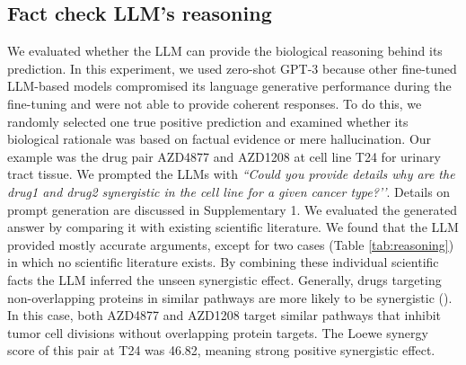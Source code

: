 \subsection{Fact check LLM's reasoning}
We evaluated whether the LLM can provide the biological reasoning behind its prediction. In this experiment, we used zero-shot GPT-3 because other fine-tuned LLM-based models compromised its language generative performance during the fine-tuning and were not able to provide coherent responses. To do this, we randomly selected one true positive prediction and examined whether its biological rationale was based on factual evidence or mere hallucination. Our example was the drug pair AZD4877 and AZD1208 at cell line T24 for urinary tract tissue. We prompted the LLMs with \emph{``Could you provide details why are the drug1 and drug2 synergistic in the cell line for a given cancer type?’’}. Details on prompt generation are discussed in Supplementary 1.  We evaluated the generated answer by comparing it with existing scientific literature. We found that the LLM provided mostly accurate arguments, except for two cases (Table \ref{tab:reasoning}) in which no scientific literature exists. By combining these individual scientific facts the LLM inferred the unseen synergistic effect. Generally, drugs targeting non-overlapping proteins in similar pathways are more likely to be synergistic (\cite{Cheng2019-dp, Tang2022-wn}).  In  this case, both AZD4877 and AZD1208 target similar pathways that inhibit tumor cell divisions without overlapping protein targets. The Loewe synergy score of this pair at T24 was 46.82, meaning strong positive synergistic effect.

